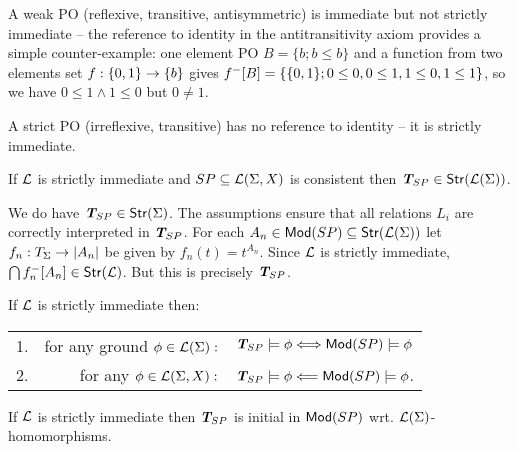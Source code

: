 \documentclass[12pt]{article}
\begin{document}
\begin{Example}
A weak PO (reflexive, transitive, antisymmetric) is immediate but not strictly immediate -- the reference to
identity in the antitransitivity axiom provides a simple
counter-example: one element PO $B=\{b;b\leq b\}$ and a function from two
elements set $f:\{0,1\}\rightarrow \{b\}$ gives $f^{-}[B] =
\{\{0,1\};0\leq 0,0\leq 1,1\leq 0,1\leq 1\}$, so we have $0\leq 1\land 1\leq
0$ but $0\not=1$.

A strict PO (irreflexive, transitive) has no reference to identity -- it is
strictly immediate. 
\end{Example}
\begin{Prop}
If ${{\cal{L}}}$  is strictly immediate and $SP\subseteq{{\cal{L}}}(\Sigma,X)$ is consistent then ${\mbox{\bf{\em T}}}_{SP}\in{\sf {Str}}({{\cal{L}}}(\Sigma))$.
\end{Prop}
\begin{Proof}
We do have ${\mbox{\bf{\em T}}}_{SP}\in{\sf {Str}}(\Sigma)$.
The assumptions ensure that all relations $L_i$ are correctly
interpreted in ${\mbox{\bf{\em T}}}_{SP}$. 
For each $A_n\in{\sf {Mod}}(SP)\subseteq{\sf {Str}}({{\cal{L}}}(\Sigma))$ let $f_n:T_{\Sigma}\rightarrow |A_n|$ be given by
$f_n(t)=t^{A_{n}}$. Since ${{\cal{L}}}$ is strictly immediate,
$\bigcap f_{n}^{-}[A_{n}]\in{\sf {Str}}({{\cal{L}}})$. But this is precisely ${\mbox{\bf{\em T}}}_{SP}$.
\end{Proof}

\begin{Prop}
If ${{\cal{L}}}$ is strictly immediate then:

\begin{tabular}{rrl}
1. & for any ground $\phi\in {{\cal{L}}}(\Sigma):$ & ${\mbox{\bf{\em T}}}_{SP}\models\phi\Longleftrightarrow
{\sf {Mod}}(SP)\models\phi$ \\
2. & for any  $\phi\in {{\cal{L}}}(\Sigma,X):$ & ${\mbox{\bf{\em T}}}_{SP}\models\phi\Longleftarrow {\sf {Mod}}(SP)\models\phi$.
\end{tabular}
\end{Prop}

\begin{Prop}
If ${{\cal{L}}}$ is strictly immediate then ${\mbox{\bf{\em T}}}_{SP}$ is initial in ${{\sf {Mod}}(SP)}$  wrt. ${{\cal{L}}}(\Sigma)$-homomorphisms.
\end{Prop}
%
\noindent\hrulefill
\end{document}
